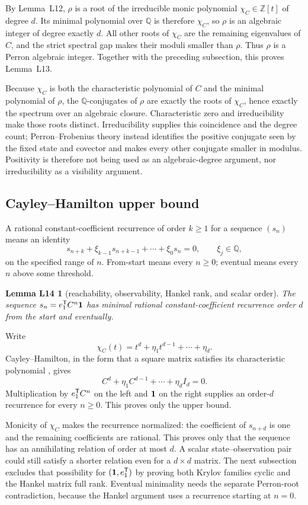 \documentclass[11pt,letterpaper]{article}
\theoremstyle{plain}
\newtheorem*{lemLfourteen}{Lemma L14}
\begin{document}
By Lemma~L12, $\rho$ is a root of the irreducible monic polynomial $\chi_C\in\mathbb Z[t]$ of degree $d$.  Its minimal polynomial over $\mathbb Q$ is therefore $\chi_C$, so $\rho$ is an algebraic integer of degree exactly $d$.  All other roots of $\chi_C$ are the remaining eigenvalues of $C$, and the strict spectral gap makes their moduli smaller than $\rho$.  Thus $\rho$ is a Perron algebraic integer.  Together with the preceding subsection, this proves Lemma~L13.

Because $\chi_C$ is both the characteristic polynomial of $C$ and the minimal polynomial of $\rho$, the $\mathbb Q$-conjugates of $\rho$ are exactly the roots of $\chi_C$, hence exactly the spectrum over an algebraic closure.  Characteristic zero and irreducibility make those roots distinct.  Irreducibility supplies this coincidence and the degree count; Perron--Frobenius theory instead identifies the positive conjugate seen by the fixed state and covector and makes every other conjugate smaller in modulus.  Positivity is therefore not being used as an algebraic-degree argument, nor irreducibility as a visibility argument.

\subsection{Cayley--Hamilton upper bound}

A rational constant-coefficient recurrence of order $k\geq1$ for a sequence $(s_n)$ means an identity
\[
s_{n+k}+\xi_{k-1}s_{n+k-1}+\cdots+\xi_0s_n=0,
\qquad \xi_j\in\mathbb Q,
\]
on the specified range of $n$.  From-start means every $n\geq0$; eventual means every $n$ above some threshold.

\begin{lemLfourteen}[reachability, observability, Hankel rank, and scalar order]
The sequence $s_n=e_1^{\mathsf{T}}C^n\mathbf{1}$ has minimal rational constant-coefficient recurrence order $d$ from the start and eventually.
\end{lemLfourteen}

Write
\[
\chi_C(t)=t^d+\eta_1t^{d-1}+\cdots+\eta_d.
\]
Cayley--Hamilton, in the form that a square matrix satisfies its characteristic polynomial \cite[Appendix, Section 8, pp.~658--659]{StdKailath1980LinearSystems}, gives
\[
C^d+\eta_1C^{d-1}+\cdots+\eta_dI_d=0.
\]
Multiplication by $e_1^{\mathsf{T}}C^n$ on the left and $\mathbf{1}$ on the right supplies an order-$d$ recurrence for every $n\geq0$.  This proves only the upper bound.

Monicity of $\chi_C$ makes the recurrence normalized: the coefficient of $s_{n+d}$ is one and the remaining coefficients are rational.  This proves only that the sequence has an annihilating relation of order at most $d$.  A scalar state--observation pair could still satisfy a shorter relation even for a $d\times d$ matrix.  The next subsection excludes that possibility for $(\mathbf{1},e_1^{\mathsf{T}})$ by proving both Krylov families cyclic and the Hankel matrix full rank.  Eventual minimality needs the separate Perron-root contradiction, because the Hankel argument uses a recurrence starting at $n=0$.
\end{document}
